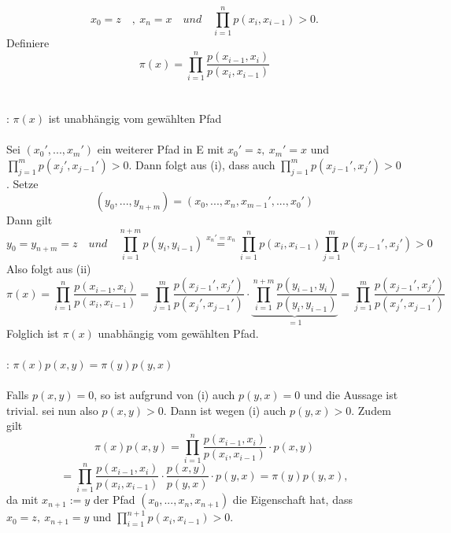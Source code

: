 \begin{equation*}
x_{0} = z \quad, \: x_{n} = x \quad und  \quad \prod_{i=1}^{n} p(x_{i},x_{i-1})>0.
\end{equation*}
Definiere
\begin{equation*}
\pi(x) = \prod_{i=1}^{n} \dfrac{p(x_{i-1},x_{i})}{p(x_{i},x_{i-1})}
\end{equation*}
\\
\\
: $\pi(x)$ ist unabhängig vom gewählten Pfad
\\
\\
Sei $(x_{0}',...,x_{m}')$ ein weiterer Pfad in E mit $x_{0}' = z, \: x_{m}' = x$ und $\prod_{j=1}^{m} p(x_{j}',x_{j-1}')>0$. Dann folgt aus (i), dass auch $\prod_{j=1}^{m} p(x_{j-1}',x_{j}')>0$. Setze
\begin{equation*}
(y_{0},...,y_{n+m}) = (x_{0},...,x_{n},x_{m-1}',...,x_{0}')
\end{equation*}
Dann gilt
\begin{equation*}
y_{0} = y_{n+m} = z \quad und \quad \prod_{i=1}^{n+m} p(y_{i},y_{i-1}) \stackrel{x_{n}'=x_{n}}{=} \prod_{i=1}^{n} p(x_{i},x_{i-1})  \prod_{j=1}^{m} p(x_{j-1}',x_{j}')>0
\end{equation*}
Also folgt aus (ii)
\begin{equation*}
\pi(x) = \prod_{i=1}^{n} \dfrac{p(x_{i-1},x_{i})}{p(x_{i},x_{i-1})} = \prod_{j=1}^{m} \dfrac{p(x_{j-1}',x_{j}')}{p(x_{j}',x_{j-1}')} \cdot \underbrace{\prod_{i=1}^{n+m} \dfrac{p(y_{i-1},y_{i})}{p(y_{i},y_{i-1})}} _{=1} = \prod_{j=1}^{m} \dfrac{p(x_{j-1}',x_{j}')}{p(x_{j}',x_{j-1}')}
\end{equation*}
Folglich ist $\pi(x)$ unabhängig vom gewählten Pfad.
\\
\\
: $\pi(x)p(x,y) = \pi(y) p(y,x)$
\\
\\
Falls $p(x,y)=0$, so ist aufgrund von (i) auch $p(y,x)=0$ und die Aussage ist trivial. sei nun also $p(x,y)>0$. Dann ist wegen (i) auch $p(y,x)>0$. Zudem gilt
\begin{equation*}
\pi(x)p(x,y) = \prod_{i=1}^{n} \dfrac{p(x_{i-1},x_{i})}{p(x_{i},x_{i-1})}  \cdot p(x,y)
\end{equation*}
\begin{equation*}
= \prod_{i=1}^{n} \dfrac{p(x_{i-1},x_{i})}{p(x_{i},x_{i-1})}  \cdot \dfrac{p(x,y)}{p(y,x)} \cdot p(y,x) = \pi(y)p(y,x),
\end{equation*}
da mit $x_{n+1}:= y$ der Pfad $(x_{0},...,x_{n},x_{n+1})$ die Eigenschaft hat, dass $x_{0} = z, \: x_{n+1} = y$ und $\prod_{i=1}^{n+1} p(x_{i},x_{i-1})>0$.


